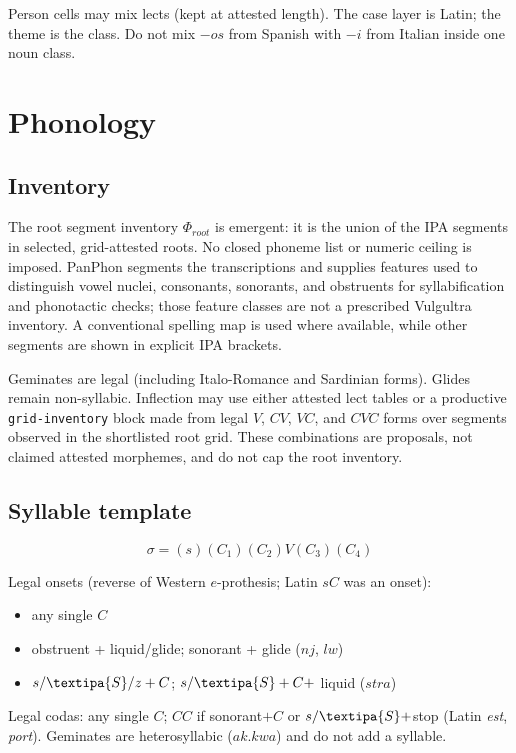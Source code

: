 \documentclass[12pt]{book}
\begin{document}
Person cells may mix lects (kept at attested length). The case layer is
Latin; the theme is the class. Do not mix $-os$ from Spanish with
$-i$ from Italian inside one noun class.

\chapter{Phonology}
\label{ch:phonology}

\section{Inventory}

The root segment inventory $\Phi_{root}$ is emergent: it is the union of the
IPA segments in selected, grid-attested roots. No closed phoneme list or
numeric ceiling is imposed. PanPhon segments the transcriptions and supplies
features used to distinguish vowel nuclei, consonants, sonorants, and
obstruents for syllabification and phonotactic checks; those feature classes
are not a prescribed Vulgultra inventory. A conventional spelling map is
used where available, while other segments are shown in explicit IPA brackets.

Geminates are legal (including Italo-Romance and Sardinian forms). Glides
remain non-syllabic. Inflection may use either attested lect tables or a
productive \texttt{grid-inventory} block made from legal $V$, $CV$, $VC$,
and $CVC$ forms over segments observed in the shortlisted root grid. These
combinations are proposals, not claimed attested morphemes, and do not cap
the root inventory.

\section{Syllable template}

\[
\sigma = (s)(C_1)(C_2) V (C_3)(C_4)
\]

Legal onsets (reverse of Western $e$-prothesis; Latin $sC$ was an onset):
\begin{itemize}
  \item any single $C$
  \item obstruent + liquid/glide; sonorant + glide ($nj$, $lw$)
  \item $s/\textipa{S}/z + C$; $s/\textipa{S} + C +$ liquid ($stra$)
\end{itemize}

Legal codas: any single $C$; $CC$ if sonorant$+C$ or $s/\textipa{S}+$stop
(Latin \emph{est}, \emph{port}). Geminates are heterosyllabic
($ak.kwa$) and do not add a syllable.
\end{document}
